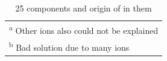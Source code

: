 \begin{table}[!h]
\begin{tabular}{cccc}
        \hline \hline  
        \multicolumn{4}{l}{\textsuperscript{a} \footnotesize{Other ions also could not be explained}} \\     
        \multicolumn{4}{l}{\textsuperscript{b} \footnotesize{Bad solution due to many ions}} \\ 

        \end{tabular}
    \caption{25  components and origin of  in them}
    \label{tab:OVI-origin}
\end{table}






